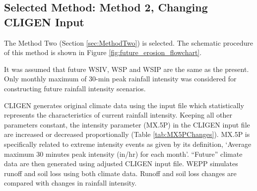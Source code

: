 \subsection{Selected Method: Method 2, Changing CLIGEN Input}
\label{sec:SelectedMethod}

The Method Two (Section \ref{sec:MethodTwo}) is selected. The schematic
procedure of this method is shown in Figure \ref{fig:future_erosion_flowchart}.

It was assumed that future WSIV, WSP and WSIP are the same as the present. Only
monthly maximum of 30-min peak rainfall intensity was considered for
constructing future rainfall intensity scenarios.

CLIGEN generates original climate data using the input file which statistically
represents the characteristics of current rainfall intensity. Keeping all other
parameters constant, the intensity parameter ({MX.5P}) in the CLIGEN input file
are increased or decreased proportionally (Table \ref{tab:MX5PChanges}).
{MX.5P} is specifically related to extreme intensity events as given by its
definition, `Average maximum 30 minutes peak intensity (in/hr) for each month'.
``Future'' climate data are then generated using adjusted CLIGEN input file.
WEPP simulates runoff and soil loss using both climate data. Runoff and soil
loss changes are compared with changes in rainfall intensity.

